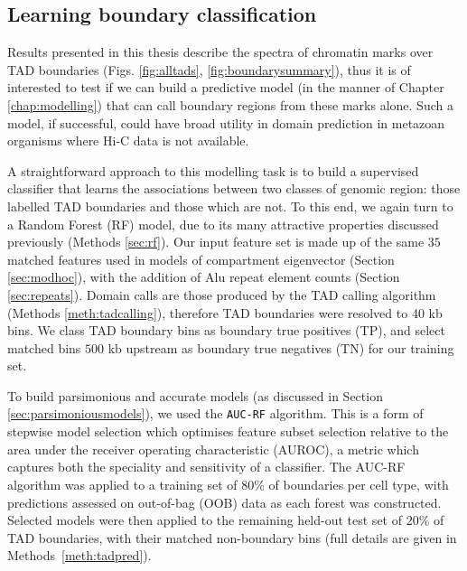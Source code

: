 \documentclass[a4paper,11pt,oneside]{book}
\begin{document}

\subsection{Learning boundary classification}\label{sec:tadpred}

Results presented in this thesis describe the spectra of chromatin marks over TAD boundaries (Figs. \ref{fig:alltads}, \ref{fig:boundarysummary}), thus it is of interested to test if we can build a predictive model (in the manner of Chapter \ref{chap:modelling}) that can call boundary regions from these marks alone. Such a model, if successful, could have broad utility in domain prediction in metazoan organisms where Hi-C data is not available.

A straightforward approach to this modelling task is to build a supervised classifier that learns the associations between two classes of genomic region: those labelled TAD boundaries and those which are not. To this end, we again turn to a Random Forest (RF) model, due to its many attractive properties discussed previously (Methods \ref{sec:rf}). Our input feature set is made up of the same $35$ matched features used in models of compartment eigenvector (Section \ref{sec:modhoc}), with the addition of Alu repeat element counts (Section \ref{sec:repeats}). Domain calls are those produced by the \citet{Dixon2012} TAD calling algorithm (Methods \ref{meth:tadcalling}), therefore TAD boundaries were resolved to 40 kb bins. We class TAD boundary bins as boundary true positives (TP), and select matched bins $500$ kb upstream as boundary true negatives (TN) for our training set.

To build parsimonious and accurate models (as discussed in Section \ref{sec:parsimoniousmodels}), we used the \texttt{AUC-RF} algorithm.\cite{Calle2011} This is a form of stepwise model selection which optimises feature subset selection relative to the area under the receiver operating characteristic (AUROC), a metric which captures both the speciality and sensitivity of a classifier. The AUC-RF algorithm was applied to a training set of $80\%$ of boundaries per cell type, with predictions assessed on out-of-bag (OOB) data as each forest was constructed. Selected models were then applied to the remaining held-out test set of $20\%$ of TAD boundaries, with their matched non-boundary bins (full details are given in Methods~\ref{meth:tadpred}). 
\end{document}
